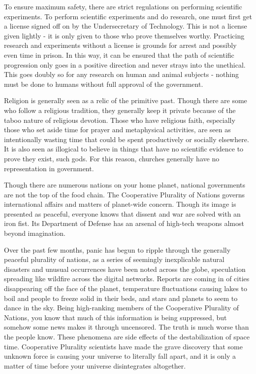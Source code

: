 \documentclass[blue]{guildcamp3}
\begin{document}
To ensure maximum safety, there are strict regulations on performing scientific experiments. To perform scientific experiments and do research, one must first get a license signed off on by the Undersecretary of Technology. This is not a license given lightly - it is only given to those who prove themselves worthy. Practicing research and experiments without a license is grounds for arrest and possibly even time in prison. In this way, it can be ensured that the path of scientific progression only goes in a positive direction and never strays into the unethical. This goes doubly so for any research on human and animal subjects - nothing must be done to humans without full approval of the government. 

Religion is generally seen as a relic of the primitive past. Though there are some who follow a religious tradition, they generally keep it private because of the taboo nature of religious devotion. Those who have religious faith, especially those who set aside time for prayer and metaphysical activities, are seen as intentionally wasting time that could be spent productively or socially elsewhere. It is also seen as illogical to believe in things that have no scientific evidence to prove they exist, such gods. For this reason, churches generally have no representation in government.

Though there are numerous nations on your home planet, national governments are not the top of the food chain. The Cooperative Plurality of Nations governs international affairs and matters of planet-wide concern. Though its image is presented as peaceful, everyone knows that dissent and war are solved with an iron fist. Its Department of Defense has an arsenal of high-tech weapons almost beyond imagination.

Over the past few months, panic has begun to ripple through the generally peaceful plurality of nations, as a series of seemingly inexplicable natural disasters and unusual occurrences have been noted across the globe, speculation spreading like wildfire across the digital networks. Reports are coming in of cities disappearing off the face of the planet, temperature fluctuations causing lakes to boil and people to freeze solid in their beds, and stars and planets to seem to dance in the sky. Being high-ranking members of the Cooperative Plurality of Nations, you know that much of this information is being suppressed, but somehow some news makes it through uncensored. The truth is much worse than the people know. These phenomena are side effects of the destabilization of space time. Cooperative Plurality scientists have made the grave discovery that some unknown force is causing your universe to literally fall apart, and it is only a matter of time before your universe disintegrates altogether.
\end{document}
